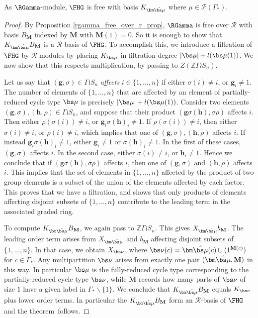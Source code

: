 \begin{theorem}
As $\RGamma$-module, $\FHG$ is free with basis $K_{\bm \hat{\bs \mu}}$ where $\mu \in \mathcal{P}(\Gamma_*)$.
\end{theorem}
\begin{proof}
By Proposition \ref{rgamma_free_over_r_prop}, $\RGamma$ is free over $\mathcal{R}$ with basis $B_{\mathbf{M}}$ indexed by $\mathbf{M}$ with $\mathbf{M}(1) = 0$. So it is enough to show that $K_{\bm\hat{\bs\mu}}B_{\mathbf{M}}$ is a $\mathcal{R}$-basis of $\FHG$. To accomplish this, we introduce a filtration of $\FHG$ by $\mathcal{R}$-modules by placing $K_{\bs \mu}$ in filtration degree $|\bs \mu| + l(\bs\mu(1))$. We now show that this respects multiplication, by passing to $Z(\mathbb{Z} \Gamma \wr S_n)$.

Let us say that $(\mathbf{g}, \sigma) \in \Gamma \wr S_n$ \emph{affects} $i \in \{1,\ldots, n\}$ if either $\sigma(i) \neq i$, or $\mathbf{g}_i \neq 1$. The number of elements of $\{1,\ldots,n\}$ that are affected by an element of partially-reduced cycle type $\bs \mu$ is precisely $|\bs \mu| + l(\bs\mu(1))$. Consider two elements $(\mathbf{g}, \sigma), (\mathbf{h}, \rho) \in \Gamma \wr S_n$, and suppose that their product $(\mathbf{g} \sigma(\mathbf{h}), \sigma \rho)$ affects $i$. Then either $\rho(\sigma(i)) \neq i$, or $\mathbf{g}_i\sigma(\mathbf{h})_i \neq 1$. If $\rho(\sigma(i)) \neq i$, then either $\sigma(i) \neq i$, or $\rho(i) \neq i$, which implies that one of $(\mathbf{g}, \sigma), (\mathbf{h}, \rho)$ affects $i$. If instead $\mathbf{g}_i\sigma(\mathbf{h})_i \neq 1$, either $\mathbf{g}_i \neq 1$ or $\sigma(\mathbf{h})_i \neq 1$. In the first of these cases, $(\mathbf{g}, \sigma)$ affects $i$. In the second case, either $\sigma(i) \neq i$, or $\mathbf{h}_i \neq 1$. Hence we conclude that if $(\mathbf{g} \sigma(\mathbf{h}), \sigma \rho)$ affects $i$, then one of $(\mathbf{g}, \sigma)$ and $(\mathbf{h}, \rho)$ affects $i$. This implies that the set of elements in $\{1,\ldots,n\}$ affected by the product of two group elements is a subset of the union of the elements affected by each factor. This proves that we have a filtration, and shows that only products of elements affecting disjoint subsets of $\{1,\ldots,n\}$ contribute to the leading term in the associated graded ring.

To compute $K_{\bm\hat{\bs\mu}}B_{\mathbf{M}}$, we again pass to $\mathbb{Z}\Gamma \wr S_n$. This gives $X_{\bm\hat{\bs\mu}}b_{\mathbf{M}}$. The leading order term arises from $X_{\bm\hat{\bs\mu}}$ and $b_{\mathbf{M}}$ affecting disjoint subsets of $\{1,\ldots, n\}$. In that case, we obtain $X_{\bs \nu}$, where $\bs \nu(c) = \bm \hat{\bs \mu}(c) \cup (1^{\mathbf{M}(c)})$ for $c \in \Gamma_*$. Any multipartition $\bs \nu$ arises from exactly one pair $(\bm\hat{\bs\mu}, \mathbf{M})$ in this way. In particular $\bs \mu$ is the fully-reduced cycle type corresponding to the partially-reduced cycle type $\bs \nu$, while $\mathbf{M}$ records how many parts of $\bs \nu$ of size $1$ have a given label in $\Gamma_*\backslash\{1\}$. We conclude that $K_{\bm\hat{\bs\mu}}B_{\mathbf{M}}$ equals $K_{\bs \nu}$ plus lower order terms. In particular the $K_{\bm\hat{\bs\mu}}B_{\mathbf{M}}$ form an $\mathcal{R}$-basis of $\FHG$ and the theorem~follows.
\end{proof}
